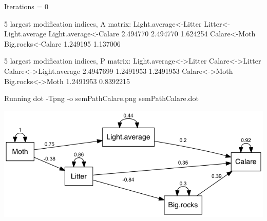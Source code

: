\documentclass[12pt]{article}
\begin{document}
\begin{Schunk}
\begin{Soutput}
 Iterations =  0 
\end{Soutput}
\begin{Soutput}
 5 largest modification indices, A matrix:
Light.average<-Litter Litter<-Light.average Light.average<-Calare 
             2.494770              2.494770              1.624254 
         Calare<-Moth     Big.rocks<-Calare 
             1.249195              1.137006 

  5 largest modification indices, P matrix:
Light.average<->Litter        Calare<->Litter Calare<->Light.average 
             2.4947699              1.2491953              1.2491953 
         Calare<->Moth       Big.rocks<->Moth 
             1.2491953              0.8392215 
\end{Soutput}
\begin{Soutput}
Running  dot -Tpng -o semPathCalare.png  semPathCalare.dot 
\end{Soutput}
\end{Schunk}


\includegraphics{semPathCalare.png}
\pagebreak
\end{document}
